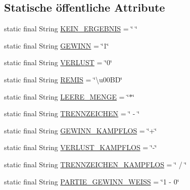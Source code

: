 \subsection*{Statische öffentliche Attribute}
\begin{DoxyCompactItemize}
\item 
static final String \hyperlink{classde_1_1turnierverwaltung_1_1model_1_1_tournament_constants_a8520f2de232a4af17edf07b0d9944ec0}{K\+E\+I\+N\+\_\+\+E\+R\+G\+E\+B\+N\+IS} = \char`\"{} \char`\"{}
\item 
static final String \hyperlink{classde_1_1turnierverwaltung_1_1model_1_1_tournament_constants_a106840d45eb32386049f45985c0da324}{G\+E\+W\+I\+NN} = \char`\"{}1\char`\"{}
\item 
static final String \hyperlink{classde_1_1turnierverwaltung_1_1model_1_1_tournament_constants_aaa7394280c871166fce6fd7516975eb3}{V\+E\+R\+L\+U\+ST} = \char`\"{}0\char`\"{}
\item 
static final String \hyperlink{classde_1_1turnierverwaltung_1_1model_1_1_tournament_constants_a27645df8961bb5a75d290e3029b3e6ce}{R\+E\+M\+IS} = \char`\"{}\textbackslash{}u00\+BD\char`\"{}
\item 
static final String \hyperlink{classde_1_1turnierverwaltung_1_1model_1_1_tournament_constants_a423ff80bf75a6f9ce7f0f09d2e37a772}{L\+E\+E\+R\+E\+\_\+\+M\+E\+N\+GE} = \char`\"{}$\ast$\char`\"{}
\item 
static final String \hyperlink{classde_1_1turnierverwaltung_1_1model_1_1_tournament_constants_a04015ca80080f7a882f1a7db01699ccb}{T\+R\+E\+N\+N\+Z\+E\+I\+C\+H\+EN} = \char`\"{} -\/ \char`\"{}
\item 
static final String \hyperlink{classde_1_1turnierverwaltung_1_1model_1_1_tournament_constants_a83c4f3c2b900de7274ceea434ebc75ef}{G\+E\+W\+I\+N\+N\+\_\+\+K\+A\+M\+P\+F\+L\+OS} = \char`\"{}+\char`\"{}
\item 
static final String \hyperlink{classde_1_1turnierverwaltung_1_1model_1_1_tournament_constants_a2a9409a9779cd4e2c0cdd69c25f58062}{V\+E\+R\+L\+U\+S\+T\+\_\+\+K\+A\+M\+P\+F\+L\+OS} = \char`\"{}-\/\char`\"{}
\item 
static final String \hyperlink{classde_1_1turnierverwaltung_1_1model_1_1_tournament_constants_af4b7e6fa88e45e9ac65583cd2f81a4dc}{T\+R\+E\+N\+N\+Z\+E\+I\+C\+H\+E\+N\+\_\+\+K\+A\+M\+P\+F\+L\+OS} = \char`\"{} / \char`\"{}
\item 
static final String \hyperlink{classde_1_1turnierverwaltung_1_1model_1_1_tournament_constants_ae113f21bcbc42d529928043cbf0c3f69}{P\+A\+R\+T\+I\+E\+\_\+\+G\+E\+W\+I\+N\+N\+\_\+\+W\+E\+I\+SS} = \char`\"{}1 -\/ 0\char`\"{}

\end{DoxyCompactItemize}
